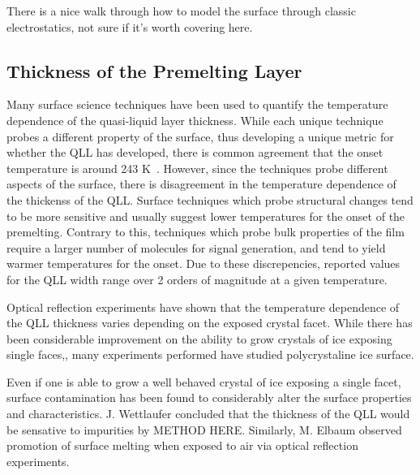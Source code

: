 There is a nice walk through how to model the surface through classic
electrostatics, not sure if it's worth covering here.



\subsection{Thickness of the Premelting Layer}
Many surface science techniques have been used to quantify the
temperature dependence of the quasi-liquid layer
thickness.\cite{Kouchi1987,Golecki1978,Dosch1995,Beaglehole1980, Bluhm1999,
  Bluhm2002, Furukawa1987, Elbaum1993, Dosch1996, Doppenschmidt2000, Kaverin2004,
  Lied1994} While each unique technique probes a different property of
the surface, thus developing a unique metric for whether the QLL has
developed, there is common agreement that the onset temperature is
around 243 K~. However, since the techniques probe different aspects
of the surface, there is disagreement in the temperature dependence of
the thickenss of the QLL. Surface techniques which probe structural
changes tend to be more sensitive and usually suggest lower
temperatures for the onset of the premelting. Contrary to this,
techniques which probe bulk properties of the film require a larger
number of molecules for signal generation, and tend to yield warmer
temperatures for the onset. Due to these discrepencies, reported
values for the QLL width range over 2 orders of magnitude at a given
temperature.\cite{Rosenberg2005,Dosch1996}

Optical reflection experiments have shown that the temperature
dependence of the QLL thickness varies depending on the exposed
crystal facet.\cite{Elbaum1993} While there has been considerable improvement
on the ability to grow crystals of ice exposing single
faces,\cite{Shultz2014, Shultz2017}, many experiments performed have studied
polycrystaline ice surface.

Even if one is able to grow a well behaved crystal of ice exposing a
single facet, surface contamination has been found to considerably
alter the surface properties and characteristics. J. Wettlaufer
concluded that the thickness of the QLL would be sensative to
impurities by METHOD HERE.\cite{Wettlaufer1999} Similarly, M. Elbaum observed
promotion of surface melting when exposed to air via optical
reflection experiments.\cite{Elbaum1993} 


